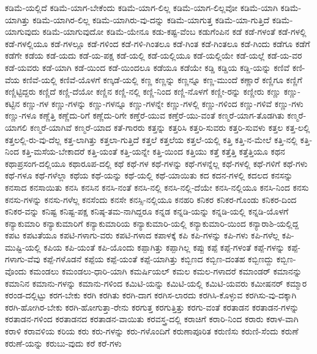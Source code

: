 {ಕಡಿಮೆ-ಯಲ್ಲಿದೆ
ಕಡಿಮೆ-ಯಾಗ-ಬೇಕೆಂದು
ಕಡಿಮೆ-ಯಾಗ-ಲಿಲ್ಲ
ಕಡಿಮೆ-ಯಾಗ-ಲಿಲ್ಲವೋ
ಕಡಿಮೆ-ಯಾಗಿ
ಕಡಿಮೆ-ಯಾಗಿತ್ತು
ಕಡಿಮೆ-ಯಾಗಿರ-ಲಿಲ್ಲ
ಕಡಿಮೆ-ಯಾಗಿರು-ವು-ದನ್ನು
ಕಡಿಮೆ-ಯಾಗುತ್ತ
ಕಡಿಮೆ-ಯಾ-ಗುತ್ತಿದೆ
ಕಡಿಮೆ-ಯಾಗುವುದು
ಕಡಿಮೆ-ಯಾಗುವುದೋ
ಕಡಿಮೆ-ಯೇನೂ
ಕಡು-ಕಷ್ಟ-ವೆಂಬ
ಕಡುಗೆಂಪಿನ
ಕಡೆ
ಕಡೆ-ಗಳಂತೆ
ಕಡೆ-ಗಳಲ್ಲಿ
ಕಡೆ-ಗಳಲ್ಲಿಯೂ
ಕಡೆ-ಗಳಲ್ಲೂ
ಕಡೆ-ಗಳಿಂದ
ಕಡೆ-ಗಳಿ-ಗಿಂತಲೂ
ಕಡೆ-ಗಿಂತ
ಕಡೆ-ಗಿಂತಲೂ
ಕಡೆ-ಗಿಂದು
ಕಡೆಗೂ
ಕಡೆಗೆ
ಕಡೆಗೇ
ಕಡೆಯ
ಕಡೆ-ಯದು
ಕಡೆ-ಯ-ಪಕ್ಷ
ಕಡೆ-ಯಲ್ಲಿ
ಕಡೆ-ಯಲ್ಲಿಯೂ
ಕಡೆ-ಯಲ್ಲಿಯೇ
ಕಡೆ-ಯಲ್ಲೆ
ಕಡೆ-ಯ-ವರ
ಕಡೆ-ಯವರು
ಕಡೆ-ಯಾಗಿ
ಕಡೆ-ಯಿಂದ
ಕಡೆ-ಯಿಂದಲೂ
ಕಡೆಯೂ
ಕಡೆಯೇ
ಕಡ್ಡಿ
ಕಡ್ಡಿಯ
ಕಡ್ಡಿ-ಯನ್ನು
ಕಣಿವೆ
ಕಣಿ-ವೆಯ
ಕಣಿವೆ-ಯಲ್ಲಿ
ಕಣಿವೆ-ಯೊಳಗೆ
ಕಣ್ಕಡೆ-ಯಲ್ಲಿ
ಕಣ್ಣ
ಕಣ್ಣನ್ನು
ಕಣ್ಣನ್ನೂ
ಕಣ್ಣ-ಮುಂದೆ
ಕಣ್ಣಾರೆ
ಕಣ್ಣಿಗೂ
ಕಣ್ಣಿಗೆ
ಕಣ್ಣಿಟ್ಟಿದ್ದರು
ಕಣ್ಣಿದೆ
ಕಣ್ಣಿ-ದೆಯೋ
ಕಣ್ಣಿನ
ಕಣ್ಣಿ-ನಲ್ಲಿ
ಕಣ್ಣಿ-ನಿಂದ
ಕಣ್ಣಿ-ನೊಳಗೆ
ಕಣ್ಣೀ-ರನ್ನು
ಕಣ್ಣೀರು
ಕಣ್ಣು
ಕಣ್ಣು-ಕಟ್ಟಿನ
ಕಣ್ಣು-ಗಳ
ಕಣ್ಣು-ಗಳನ್ನು
ಕಣ್ಣು-ಗಳನ್ನೂ
ಕಣ್ಣು-ಗಳನ್ನೇ
ಕಣ್ಣು-ಗಳಲ್ಲಿ
ಕಣ್ಣು-ಗಳಿಂದ
ಕಣ್ಣು-ಗಳಿವೆ
ಕಣ್ಣು-ಗಳು
ಕಣ್ಣು-ಗಳೂ
ಕಣ್ಣೆತ್ತಿ
ಕಣ್ಣೆದು-ರಿಗೆ
ಕಣ್ಣೆದು-ರಿಗೇ
ಕಣ್ತೆರೆ-ಯುವ
ಕಣ್ತೆರೆ-ಯು-ವಂತೆ
ಕಣ್ಮರೆ-ಯಾಗ-ತೊಡಗಿತು
ಕಣ್ಮರೆ-ಯಾಗಲಿ
ಕಣ್ಮರೆ-ಯಾಗಿವೆ
ಕಣ್ಮರೆ-ಯಾದ
ಕತೆ-ಗಾರರು
ಕತ್ತನ್ನು
ಕತ್ತರಿಸಿ
ಕತ್ತರಿ-ಸುವರು
ಕತ್ತರಿ-ಸುವಳು
ಕತ್ತಲ
ಕತ್ತ-ಲಲ್ಲಿ
ಕತ್ತಲಲ್ಲಿ-ರು-ವು-ದೆಲ್ಲ
ಕತ್ತ-ಲಾಗಿತ್ತು
ಕತ್ತಲಾ-ಗುತ್ತಿದೆ
ಕತ್ತಲೆ
ಕತ್ತಲೆಯ
ಕತ್ತಲೆ-ಯಲ್ಲಿ
ಕತ್ತಿ
ಕತ್ತಿ-ನ-ಮೇಲೆ
ಕತ್ತಿ-ನಲ್ಲಿ
ಕತ್ತಿ-ನಿಂದ
ಕತ್ತಿ-ಮಸೆಯ-ಬೇಕಾದರೆ
ಕತ್ತಿ-ಯಂತೆ
ಕತ್ತಿ-ಯನ್ನೇ
ಕತ್ತಿ-ಯಿಂದ
ಕತ್ತಿಯು
ಕತ್ತೆ
ಕತ್ತೆತ್ತಿ
ಕತ್ತೆತ್ತಿಯೂ
ಕಥನ
ಕಥಾಪ್ರಸಂಗ-ದಲ್ಲಿಯೂ
ಕಥಾರೂಪ-ದಲ್ಲಿ
ಕಥೆ
ಕಥೆ-ಗಳ
ಕಥೆ-ಗಳನ್ನು
ಕಥೆ-ಗಳನ್ನೆಲ್ಲ
ಕಥೆ-ಗಳಲ್ಲಿ
ಕಥೆ-ಗಳಿಗೆ
ಕಥೆ-ಗಳು
ಕಥೆ-ಗಳೂ
ಕಥೆ-ಗಳೆಲ್ಲಾ
ಕಥೆಯ
ಕಥೆ-ಯನ್ನು
ಕಥೆ-ಯಲ್ಲಿ
ಕಥೆ-ಯಾಯಿತು
ಕದ
ಕದನ-ಗಳಲ್ಲಿ
ಕದಲದ
ಕನಸನ್ನು
ಕನಸಾದ
ಕನಸಾಯಿತು
ಕನಸಿ
ಕನಸಿನ
ಕನಸಿ-ನಂತೆ
ಕನಸಿ-ನಲ್ಲಿ
ಕನಸಿ-ನಲ್ಲಿ-ದೆಯೇ
ಕನಸಿ-ನಲ್ಲಿಯೂ
ಕನಸಿ-ನಿಂದ
ಕನಸು
ಕನಸು-ಗಳನ್ನು
ಕನಸು-ಗಳೆಲ್ಲ
ಕನಸೆಂದು
ಕನಸೇ
ಕನಸ್ಸಿ-ನಲ್ಲಿಯೂ
ಕನಹರಿ
ಕನಿಕರ
ಕನಿಕರ-ಗೊಂಡು
ಕನಿಕರ-ದಿಂದ
ಕನಿಕರ-ವನ್ನು
ಕನಿಷ್ಟ
ಕನಿಷ್ಟ-ಪಕ್ಷ
ಕನಿಷ್ಠ-ತಮ-ನಾಗಿದ್ದರೂ
ಕನ್ನಡ
ಕನ್ನಡಿ-ಯನ್ನು
ಕನ್ನಡಿ-ಯಲ್ಲಿ
ಕನ್ನಡಿ-ಯೊಳಗೆ
ಕನ್ಯಾಕುಮಾರಿ
ಕನ್ಯಾಕುಮಾರಿಗೆ
ಕನ್ಯಾಕುಮಾರಿಯ
ಕನ್ಯಾಕುಮಾರಿ-ಯಲ್ಲಿ
ಕನ್ಯಾಕುಮಾರಿ-ಯಿಂದ
ಕನ್ಯಾರಾಶಿ-ಯಲ್ಲಿದ್ದ
ಕಪಟ
ಕಪಟತೆಯೂ
ಕಪಟಿ-ಗಳಾಗು-ವರು
ಕಪಟಿ-ಗಳಾದ
ಕಪಾಳಕ್ಕೆ
ಕಪಿ
ಕಪಿ-ಗಳನ್ನು
ಕಪಿ-ಗಳು
ಕಪಿ-ಗಳೆಲ್ಲ
ಕಪಿ-ಮುಷ್ಟಿ-ಯಲ್ಲಿ
ಕಪಿಯ
ಕಪಿ-ಯಂತೆ
ಕಪಿ-ಯೊಂದು
ಕಪ್ಪಾಗಿತ್ತು
ಕಪ್ಪಾಗಿಲ್ಲ
ಕಪ್ಪು
ಕಪ್ಪೆ
ಕಪ್ಪೆ-ಗಳಂತೆ
ಕಪ್ಪೆ-ಗಳನ್ನು
ಕಪ್ಪೆ-ಗಳಾಗು-ವೆವು
ಕಪ್ಪೆ-ಗಳೊಡನೆ
ಕಪ್ಪೆಯ
ಕಪ್ಪೆ-ಯಂತೆ
ಕಪ್ಪೆ-ಯಾಗಿತ್ತು
ಕಬ್ಬಿಣದ
ಕಬ್ಬಿಣ-ದಂತಹ
ಕಬ್ಬಿಣದ್ದು
ಕಬ್ಬಿಣ-ವೊಂದು
ಕಮಂಡಲು
ಕಮಂಡಲು-ಧಾರಿ-ಯಾಗಿ
ಕಮರ್ಷಿಯಲ್
ಕಮಲ
ಕಮಲ-ಗಳಾದರೆ
ಕಮಾಂಡರ್
ಕಮಾನನ್ನು
ಕಮಾನಿನ
ಕಮಾನು-ಗಳನ್ನು
ಕಮಾನು-ಗಳಿಂದ
ಕಮಿಟಿ-ಯನ್ನು
ಕಮಿಟಿ-ಯಲ್ಲಿ
ಕಮಿಟಿ-ಯವರು
ಕಮೀಷನರ್
ಕಮ್ಮಾರ
ಕರಂಡ-ದಲ್ಲಿಟ್ಟು
ಕರಗ-ಬೇಕು
ಕರಗಿ
ಕರಗಿತು
ಕರಗಿ-ದಾಗ
ಕರಗಿಸ-ಲಾರದು
ಕರಗಿಸಿ-ಕೊಳ್ಳುವ
ಕರಗಿಸು-ವು-ದಕ್ಕಾಗಿ
ಕರಗಿ-ಹೋಗಿರ-ಬೇಕು
ಕರಗಿ-ಹೋಗುತ್ತಾ-ರೇನು
ಕರಗುತ್ತ
ಕರಗುತ್ತಿತ್ತು
ಕರಗು-ವಂತೆ
ಕರತಾಡನ
ಕರತಾಡನ-ಗಳನ್ನು
ಕರತಾಡನ-ಗಳಿಂದ
ಕರತಾಡನದ
ಕರತಾಡನ-ವಾಯಿತು
ಕರವಸ್ತ್ರ-ದಲ್ಲಿ
ಕರಾಚಿಗೆ
ಕರಾರಿ-ನಿಂದ
ಕರಾರು
ಕರಾಳ-ವಾಗಿ
ಕರಾಳಿ
ಕರಾವಳಿಯ
ಕರಿಯ
ಕರು
ಕರು-ಗಳನ್ನು
ಕರು-ಗಳೊಂದಿಗೆ
ಕರುಣಾಪೂರಿತ
ಕರುಣಿಸು
ಕರುಣಿ-ಸೆಂದು
ಕರುಣೆ
ಕರುಣೆ-ಯನ್ನು
ಕರುಬು-ವುದು
ಕರೆ
ಕರೆ-ಗಳು
}
